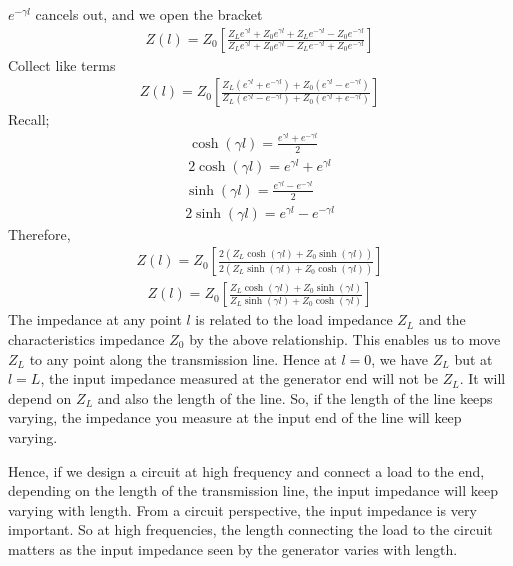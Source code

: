 $e^{-\gamma l}$ cancels out, and we open the bracket
\begin{align*}
Z(l) = Z_0 \left[\frac{Z_L e^{\gamma l} + Z_0e^{\gamma l} + Z_L e^{-\gamma l} - Z_0e^{-\gamma l}}{Z_L e^{\gamma l} + Z_0e^{\gamma l} - Z_L e^{-\gamma l} + Z_0e^{-\gamma l}}\right]
\end{align*}
Collect like terms
\begin{align*}
Z(l) = Z_0 \left[\frac{Z_L(e^{\gamma l} + e^{-\gamma l}) + Z_0(e^{\gamma l} - e^{-\gamma l})}{Z_L (e^{\gamma l} - e^{-\gamma l}) + Z_0(e^{\gamma l} + e^{-\gamma l})}\right]
\end{align*}
Recall; 
\begin{align*}
\cosh(\gamma l) = \frac{e^{\gamma l} + e^{-\gamma l}}{2}\\
2\cosh(\gamma l) = e^{\gamma l} + e^{\gamma l}
\end{align*}
\begin{align*}
\sinh(\gamma l) = \frac{e^{\gamma l} - e^{-\gamma l}}{2}\\
2\sinh(\gamma l) = e^{\gamma l} - e^{-\gamma l}
\end{align*}
Therefore,
\begin{align*}
Z(l) = Z_0\left[\frac{2(Z_L\cosh(\gamma l) + Z_0\sinh(\gamma l))}{2(Z_L\sinh(\gamma l) + Z_0\cosh(\gamma l))}\right]
\end{align*}
\begin{align}
Z(l) = Z_0\left[\frac{Z_L\cosh(\gamma l) + Z_0\sinh(\gamma l)}{Z_L\sinh(\gamma l) + Z_0\cosh(\gamma l)}\right]
\label{eqn:imp}
\end{align}
The impedance at any point $l$ is related to the load impedance $Z_L$ and the characteristics impedance $Z_0$ by the above relationship. This enables us to move $Z_L$ to any point along the transmission line. Hence at $l = 0$, we have $Z_L$ but at $l = L$, the input impedance measured at the generator end will not be $Z_L$. It will depend on $Z_L$ and also the length of the line. So, if the length of the line keeps varying, the impedance you measure at the input end of the line will keep varying. 

Hence, if we design a circuit at high frequency and connect a load to the end, depending on the length of the transmission line, the input impedance will keep varying with length. From a circuit perspective, the input impedance is very important. So at high frequencies, the length connecting the load to the circuit matters as the input impedance seen by the generator varies with length.

